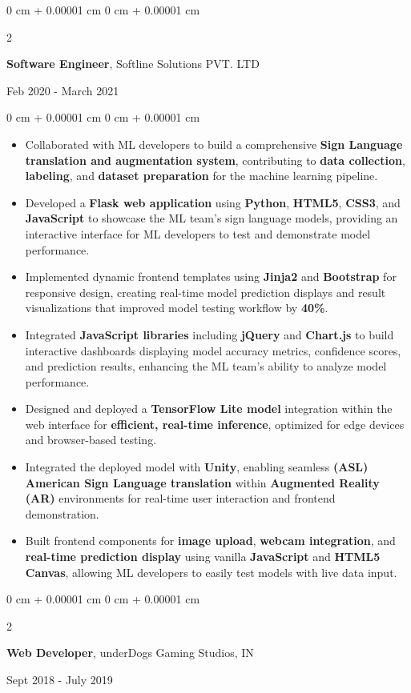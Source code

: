 \documentclass[10pt, letterpaper]{article}
\newenvironment{highlights}{
    \begin{itemize}[
        topsep=0.10 cm,
        parsep=0.10 cm,
        partopsep=0pt,
        itemsep=0pt,
        leftmargin=0 cm + 10pt
    ]
}{
    \end{itemize}
} %
\newenvironment{onecolentry}{
    \begin{adjustwidth}{
        0 cm + 0.00001 cm
    }{
        0 cm + 0.00001 cm
    }
}{
    \end{adjustwidth}
} %
\newenvironment{twocolentry}[2][]{
    \onecolentry
    \def\secondColumn{#2}
    \setcolumnwidth{\fill, 4.5 cm}
    \begin{paracol}{2}
}{
    \switchcolumn \raggedleft \secondColumn
    \end{paracol}
    \endonecolentry
} %
\begin{document}
\vspace{0.15 cm}
\begin{twocolentry}{
		Feb 2020 - March 2021
	}
	\textbf{Software Engineer}, Softline Solutions PVT. LTD
\end{twocolentry}
\begin{onecolentry}
	\begin{highlights}
		\item Collaborated with ML developers to build a comprehensive \textbf{Sign Language translation and augmentation system}, contributing to \textbf{data collection}, \textbf{labeling}, and \textbf{dataset preparation} for the machine learning pipeline.
		\item Developed a \textbf{Flask web application} using \textbf{Python}, \textbf{HTML5}, \textbf{CSS3}, and \textbf{JavaScript} to showcase the ML team's sign language models, providing an interactive interface for ML developers to test and demonstrate model performance.
		\item Implemented dynamic frontend templates using \textbf{Jinja2} and \textbf{Bootstrap} for responsive design, creating real-time model prediction displays and result visualizations that improved model testing workflow by \textbf{40\%}.
		\item Integrated \textbf{JavaScript libraries} including \textbf{jQuery} and \textbf{Chart.js} to build interactive dashboards displaying model accuracy metrics, confidence scores, and prediction results, enhancing the ML team's ability to analyze model performance.
		\item Designed and deployed a \textbf{TensorFlow Lite model} integration within the web interface for \textbf{efficient, real-time inference}, optimized for edge devices and browser-based testing.
		\item Integrated the deployed model with \textbf{Unity}, enabling seamless \textbf{(ASL) American Sign Language translation} within \textbf{Augmented Reality (AR)} environments for real-time user interaction and frontend demonstration.
		\item Built frontend components for \textbf{image upload}, \textbf{webcam integration}, and \textbf{real-time prediction display} using vanilla \textbf{JavaScript} and \textbf{HTML5 Canvas}, allowing ML developers to easily test models with live data input.
	\end{highlights}
\end{onecolentry}




\vspace{0.15 cm}
\begin{twocolentry}{
		Sept 2018 - July 2019
	}
	\textbf{Web Developer}, underDogs Gaming Studios, IN
\end{twocolentry}
\end{document}
